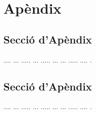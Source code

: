 ﻿\documentclass[10pt,a4paper,twocolumn,twoside]{article}
\begin{document}
\appendix

\section*{Apèndix}

\setcounter{section}{1}

\subsection{Secció d'Apèndix}
.... ... ..... ... ..... ... ... ..... .... .

\subsection{Secció d'Apèndix}
.... ... ..... ... ..... ... ... ..... .... .
\end{document}
